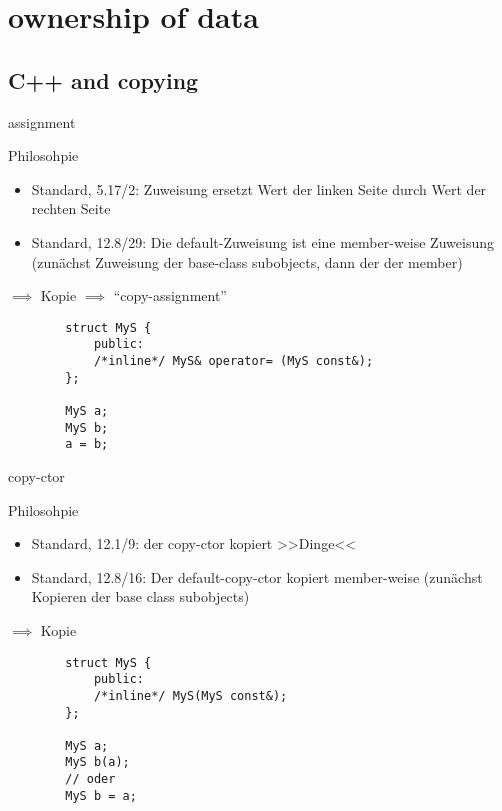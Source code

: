 \section{ownership of data}


\subsection{C++ and copying}

\begin{frame}[fragile]{assignment}
	\begin{block}{Philosohpie}
		\begin{itemize}
			\item Standard, 5.17/2: Zuweisung ersetzt Wert der linken Seite durch Wert der rechten Seite
			\item Standard, 12.8/29: Die default-Zuweisung ist eine member-weise Zuweisung (zunächst Zuweisung der base-class subobjects, dann der der member)
		\end{itemize}
		
		$\implies$ Kopie $\implies$ \enquote{copy-assignment}
	\end{block}
	
	\pause
	
	\begin{lstlisting}
		struct MyS {
			public:
			/*inline*/ MyS& operator= (MyS const&);
		};
		
		MyS a;
		MyS b;
		a = b;
	\end{lstlisting}
\end{frame}

\begin{frame}[fragile]{copy-ctor}
	\begin{block}{Philosohpie}
		\begin{itemize}
			\item Standard, 12.1/9: der copy-ctor kopiert >>Dinge<<
			\item Standard, 12.8/16: Der default-copy-ctor kopiert member-weise (zunächst Kopieren der base class subobjects)
		\end{itemize}
		
		$\implies$ Kopie
	\end{block}
	
	\begin{lstlisting}
		struct MyS {
			public:
			/*inline*/ MyS(MyS const&);
		};
		
		MyS a;
		MyS b(a);
		// oder
		MyS b = a;
	\end{lstlisting}
\end{frame}


